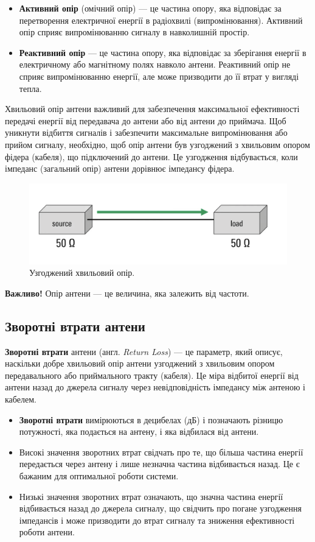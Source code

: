 \documentclass{article}
\begin{document}
\begin{itemize}[noitemsep, topsep=8pt]
\item \textbf{Активний опір} (омічний опір) --- це частина опору, яка відповідає за перетворення електричної енергії в радіохвилі (випромінювання). Активний опір сприяє випромінюванню сигналу в навколишній простір.
\item \textbf{Реактивний опір} --- це частина опору, яка відповідає за зберігання енергії в електричному або магнітному полях навколо антени. Реактивний опір не сприяє випромінюванню енергії, але може призводити до її втрат у вигляді тепла.
\end{itemize}

Хвильовий опір антени важливий для забезпечення максимальної ефективності передачі енергії від передавача до антени або від антени до приймача. Щоб уникнути відбиття сигналів і забезпечити максимальне випромінювання або прийом сигналу, необхідно, щоб опір антени був узгоджений з хвильовим опором фідера (кабеля), що підключений до антени. Це узгодження відбувається, коли імпеданс (загальний опір) антени дорівнює імпедансу фідера.


\begin{figure}[H]
\centering
\includegraphics[width=0.75\linewidth]{images/impedance.png}
\caption{\label{fig:impedance}Узгоджений хвильовий опір.}
\end{figure}

\textbf{Важливо!} Опір антени — це величина, яка залежить від частоти.

\subsection{Зворотні втрати антени}

\textbf{Зворотні втрати} антени (англ. \textit{Return Loss}) --- це параметр, який описує, наскільки добре хвильовий опір антени узгоджений з хвильовим опором передавального або приймального тракту (кабеля). Це міра відбитої енергії від антени назад до джерела сигналу через невідповідність імпедансу між антеною і кабелем.

\begin{itemize}[noitemsep, topsep=8pt]
\item \textbf{Зворотні втрати} вимірюються в децибелах (дБ) і позначають різницю потужності, яка подається на антену, і яка відбилася від антени.
\item Високі значення зворотних втрат свідчать про те, що більша частина енергії передається через антену і лише незначна частина відбивається назад. Це є бажаним для оптимальної роботи системи.
\item Низькі значення зворотних втрат означають, що значна частина енергії відбивається назад до джерела сигналу, що свідчить про погане узгодження імпедансів і може призводити до втрат сигналу та зниження ефективності роботи антени.
\end{itemize}
\end{document}
